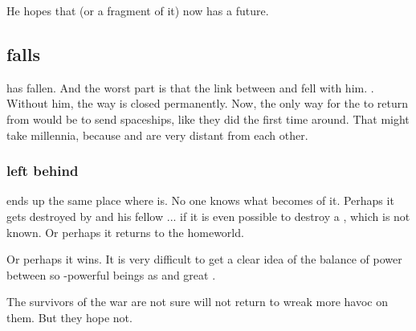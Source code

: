 \begin{garbage}

He hopes that \Miith{} (or a fragment of it) now has a future. 












\subsection{\Daggerrain{} falls}
\Daggerrain{} has fallen. 
And the worst part is that the link between \Erebos{} and \Nyx{} fell with him. 
. Without him, the way is closed permanently. 
Now, the only way for the \banes{} to return from \Erebos{} would be to send spaceships, like they did the first time around. 
That might take millennia, because \Erebos{} and \Miith{} are very distant from each other. 





\subsubsection{\HothNrul{} left behind}
\HothNrul{} ends up the same place where \Daggerrain{} is. 
No one knows what becomes of it. 
Perhaps it gets destroyed by \Daggerrain{} and his fellow \banelords... if it is even possible to destroy a \xs, which is not known. 
Or perhaps it returns to the \xs{} homeworld. 

Or perhaps it wins. 
It is very difficult to get a clear idea of the balance of power between so \uber-powerful beings as \xss{} and great \banelords. 

The survivors of the war are not sure \HothNrul{} will not return to wreak more havoc on them. 
But they hope not. 
















\end{garbage}
